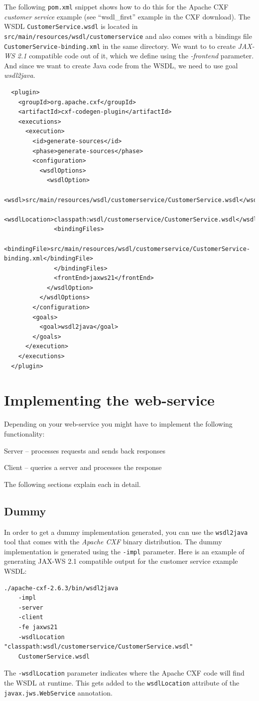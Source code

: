 \documentclass[a4paper]{book}
\begin{document}
The following \texttt{pom.xml} snippet shows how to do this for the Apache
CXF \textit{customer service} example (see ``wsdl\_first'' example in the 
CXF download). The WSDL \texttt{CustomerService.wsdl} is located in 
\texttt{src/main/resources/wsdl/customerservice} and also comes with a 
bindings file \texttt{CustomerService-binding.xml} in the same directory.
We want to to create \textit{JAX-WS 2.1} compatible code out of it, which we
define using the \textit{-frontend} parameter. And since we want to create
Java code from the WSDL, we need to use goal \textit{wsdl2java}.
{\scriptsize
\begin{verbatim}
  <plugin>
    <groupId>org.apache.cxf</groupId>
    <artifactId>cxf-codegen-plugin</artifactId>
    <executions>
      <execution>
        <id>generate-sources</id>
        <phase>generate-sources</phase>
        <configuration>
          <wsdlOptions>
            <wsdlOption>
              <wsdl>src/main/resources/wsdl/customerservice/CustomerService.wsdl</wsdl>
              <wsdlLocation>classpath:wsdl/customerservice/CustomerService.wsdl</wsdlLocation>
              <bindingFiles>
                <bindingFile>src/main/resources/wsdl/customerservice/CustomerService-binding.xml</bindingFile>
              </bindingFiles>
              <frontEnd>jaxws21</frontEnd>
            </wsdlOption>
          </wsdlOptions>
        </configuration>
        <goals>
          <goal>wsdl2java</goal>
        </goals>
      </execution>
    </executions>
  </plugin>
\end{verbatim}
}

\section{Implementing the web-service}
Depending on your web-service you might have to implement the following
functionality:
\begin{tight_itemize}
	\item {Server} -- processes requests and sends back responses
	\item {Client} -- queries a server and processes the response
\end{tight_itemize}
The following sections explain each in detail.

\subsection{Dummy}
In order to get a dummy implementation generated, you can use the 
\texttt{wsdl2java} tool that comes with the \textit{Apache CXF} binary 
distribution. The dummy implementation is generated using the \texttt{-impl} 
parameter. Here is an example of generating JAX-WS 2.1 compatible output
for the customer service example WSDL:
{\scriptsize
\begin{verbatim}
./apache-cxf-2.6.3/bin/wsdl2java 
    -impl
    -server
    -client
    -fe jaxws21 
    -wsdlLocation "classpath:wsdl/customerservice/CustomerService.wsdl" 
    CustomerService.wsdl
\end{verbatim}}
The \texttt{-wsdlLocation} parameter indicates where the Apache CXF code
will find the WSDL at runtime. This gets added to the \texttt{wsdlLocation}
attribute of the \texttt{javax.jws.WebService} annotation.
\end{document}
